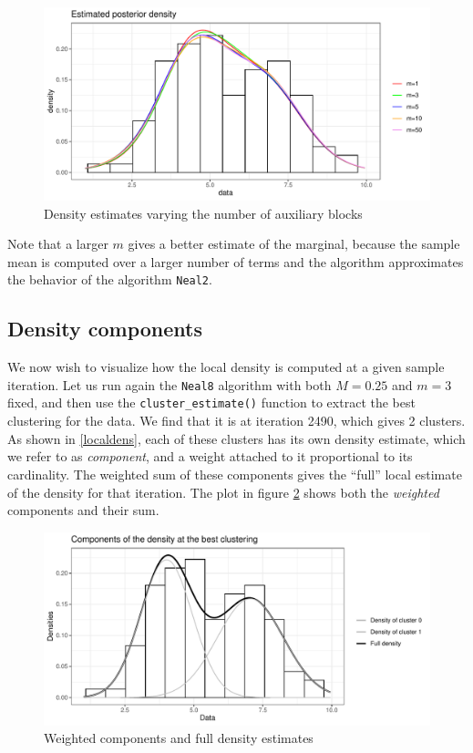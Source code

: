 \begin{figure}[h]
	\centering
	\includegraphics[scale=0.6]{etc/dens_withmM10.pdf}
	\caption{Density estimates varying the number of auxiliary blocks}

	\label{fig:density_n_aux}
\end{figure}

Note that a larger $m$ gives a better estimate of the marginal, because the sample mean is computed over a larger number of terms and the algorithm approximates the behavior of the algorithm \verb|Neal2|.



\subsection{Density components}
We now wish to visualize how the local density is computed at a given sample iteration.
Let us run again the \verb|Neal8| algorithm with both $M=0.25$ and $m=3$ fixed, and then use the \verb|cluster_estimate()| function to extract the best clustering for the data.
We find that it is at iteration 2490, which gives 2 clusters.
As shown in \ref{localdens}, each of these clusters has its own density estimate, which we refer to as \emph{component}, and a weight attached to it proportional to its cardinality.
The weighted sum of these components gives the ``full'' local estimate of the density for that iteration.
The plot in figure \ref{fig:components_density} shows both the \emph{weighted} components and their sum.
\begin{figure}[h]
	\centering
	\includegraphics[scale=0.6]{etc/componentsM025m3_best.pdf}
	\caption{Weighted components and full density estimates}

	\label{fig:components_density}
\end{figure}


